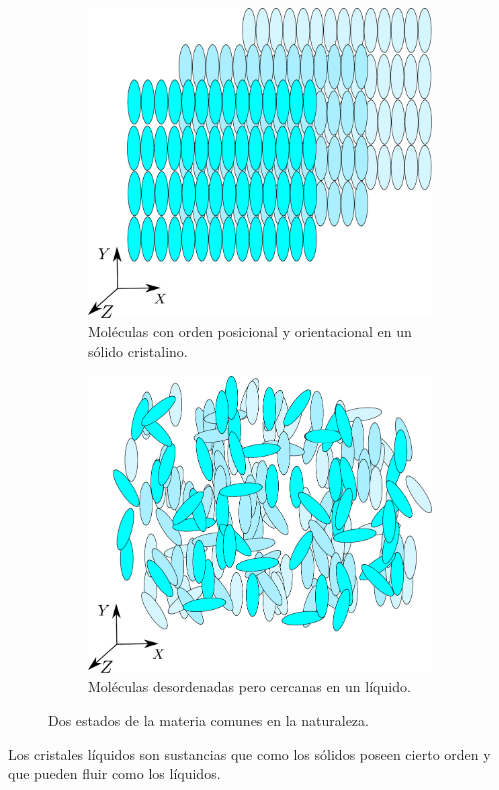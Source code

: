 \begin{figure}
\centering
\begin{subfigure}{.45\textwidth}
  \centering
  \includegraphics[width=.6\linewidth]{Cristaline_solid}
  \caption{Moléculas con orden posicional y orientacional en un sólido cristalino.}
  \label{fig:solido}
\end{subfigure}\qquad
\begin{subfigure}{.45\textwidth}
  \centering
  \includegraphics[width=.6\linewidth]{liquid}
  \caption{Moléculas desordenadas pero cercanas en un líquido.}
  \label{fig:liquido}
\end{subfigure}
\caption{Dos estados de la materia comunes en la naturaleza.}
  \label{fig:estados}
\end{figure}
Los cristales líquidos son sustancias que como los
sólidos poseen cierto orden y que pueden fluir como los líquidos. 


